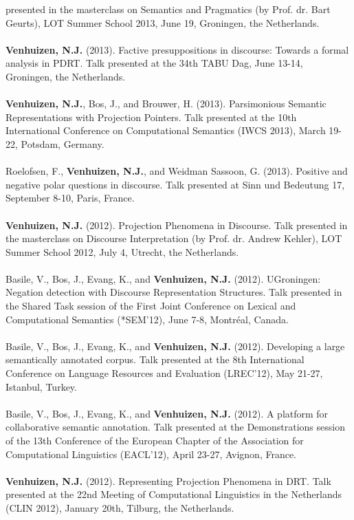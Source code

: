 \documentclass[a4paper,10pt]{article}
\begin{document}
    presented in the masterclass on Semantics and Pragmatics (by Prof. dr. Bart
    Geurts), LOT Summer School 2013, June 19, Groningen, the Netherlands.\\
    \\
    \textbf{Venhuizen, N.J.} (2013). Factive presuppositions in discourse:
    Towards a formal analysis in PDRT. Talk presented at the 34th TABU Dag,
    June 13-14, Groningen, the Netherlands.\\
    \\
    \textbf{Venhuizen, N.J.}, Bos, J., and Brouwer, H. (2013). Parsimonious 
    Semantic Representations with Projection Pointers. Talk presented at
    the 10th International Conference on Computational Semantics (IWCS 2013),
    March 19-22, Potsdam, Germany.\\
    \\
    Roelofsen, F., \textbf{Venhuizen, N.J.}, and Weidman Sassoon, G. (2013).
    Positive and negative polar questions in discourse. Talk presented at
    Sinn und Bedeutung 17, September 8-10, Paris, France.\\
    \\
    \textbf{Venhuizen, N.J.} (2012). Projection Phenomena in Discourse. Talk
    presented in the masterclass on Discourse Interpretation (by Prof. dr.
    Andrew Kehler), LOT Summer School 2012, July 4, Utrecht, the Netherlands.\\
    \\
    Basile, V., Bos, J., Evang, K., and \textbf{Venhuizen, N.J.} (2012).
    UGroningen: Negation detection with Discourse Representation Structures.
    Talk presented in the Shared Task session of the First Joint Conference
    on Lexical and Computational Semantics (*SEM'12), June 7-8, Montr{\'e}al,
    Canada.\\
    \\
    Basile, V., Bos, J., Evang, K., and \textbf{Venhuizen, N.J.} (2012).
    Developing a large semantically annotated corpus. Talk presented at the
    8th International Conference on Language Resources and Evaluation
    (LREC'12), May 21-27, Istanbul, Turkey.\\
    \\
    Basile, V., Bos, J., Evang, K., and \textbf{Venhuizen, N.J.} (2012).
    A platform for collaborative semantic annotation. Talk presented at the
    Demonstrations session of the 13th Conference of the European Chapter of
    the Association for Computational Linguistics (EACL'12), April 23-27,
    Avignon, France.\\
    \\
    \textbf{Venhuizen, N.J.} (2012). Representing Projection Phenomena in
    DRT. Talk presented at the 22nd Meeting of Computational Linguistics in
    the Netherlands (CLIN 2012), January 20th, Tilburg, the Netherlands.
\end{document}
